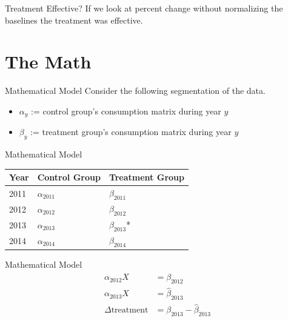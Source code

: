 \documentclass{beamer}
\begin{document}
\begin{frame}{Treatment Effective?}
  If we look at percent change without normalizing the baselines the treatment was effective.
\end{frame}

\section{The Math}

\begin{frame}{Mathematical Model}
  Consider the following segmentation of the data.
  \begin{itemize}
    \item $\alpha_y$ := control group's consumption matrix during year $y$
    \item $\beta_y$ := treatment group's consumption matrix during year $y$
  \end{itemize}
\end{frame}

\begin{frame}{Mathematical Model}
  \begin{table}[h!]
  \centering
    \begin{tabular}{|p{3cm}|p{3.5cm}|p{3.5cm}|}
        \hline
        Year & Control Group & Treatment Group \\
        \hline
        2011 & $\alpha_{2011}$ & $\beta_{2011}$ \\
        2012 & $\alpha_{2012}$ & $\beta_{2012}$ \\
        2013 & $\alpha_{2013}$ & $\beta_{2013}$* \\
        2014 & $\alpha_{2014}$ & $\beta_{2014}$ \\
        \hline
    \end{tabular}
  \end{table}
\end{frame}

\begin{frame}{Mathematical Model}
  \begin{align}
    \begin{split}
        \alpha_{2012} X &= \beta_{2012} \\
        \alpha_{2013} X &= \hat\beta_{2013} \\
        \Delta\mbox{treatment} &= \beta_{2013} - \hat\beta_{2013}
    \end{split}
  \end{align}
\end{frame}
\end{document}
